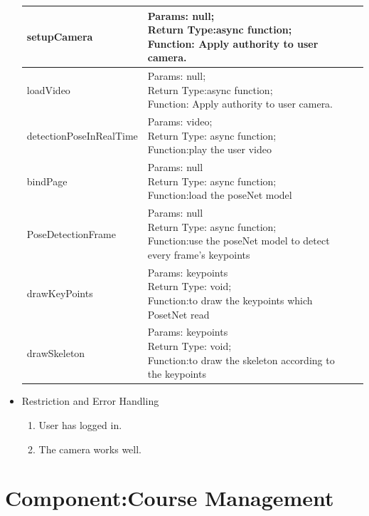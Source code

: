 \documentclass[16pt]{scrreprt}
\begin{document}
\begin{itemize}
\begin{center}
\begin{tabular}{p{6cm}p{10cm}}
        \hline
        setupCamera & \makecell[l]{Params: null;\\Return Type:async function;\\Function: Apply authority to user camera.}\\ 
        \hline
        loadVideo & \makecell[l]{Params: null;\\Return Type:async function;\\Function: Apply authority to user camera.}\\ 
        \hline
        detectionPoseInRealTime & \makecell[l]{Params: video;\\Return Type: async function;\\Function:play the user video}\\
        \hline
        bindPage &  \makecell[l]{Params: null\\Return Type: async function;\\Function:load the poseNet model}\\
        \hline
        PoseDetectionFrame & \makecell[l]{Params: null\\Return Type: async function;\\Function:use the poseNet model to detect \\every frame's keypoints}\\
        \hline
        drawKeyPoints & \makecell[l]{Params: keypoints\\Return Type: void;\\Function:to draw the keypoints which \\PosetNet read}\\
        \hline
        drawSkeleton & \makecell[l]{Params: keypoints\\Return Type: void;\\Function:to draw the skeleton according to \\the keypoints}\\
        \hline
    \end{tabular}
\end{center}
\item Restriction and Error Handling\\
\begin{enumerate}
    \item User has logged in.
    \item The camera works well.
\end{enumerate} 
\end{itemize}


\section{Component:Course Management}
\end{document}
